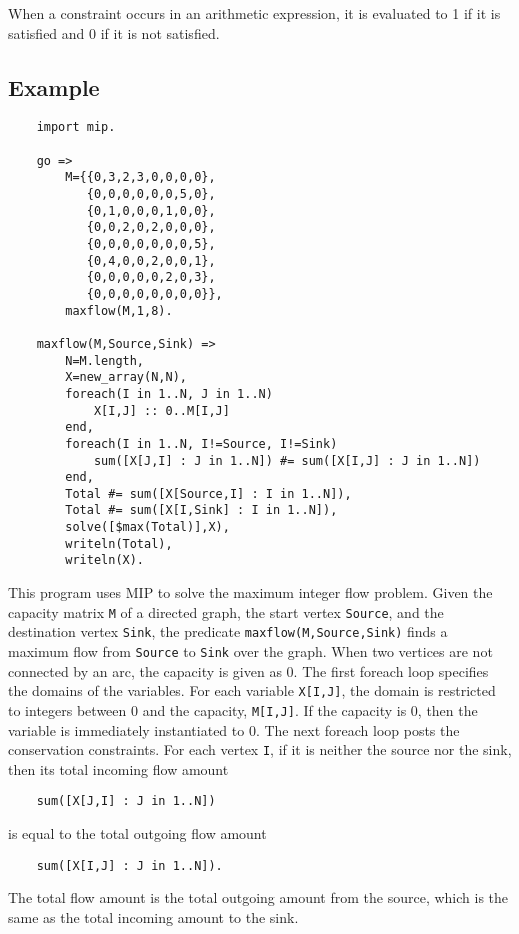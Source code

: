 When a constraint occurs in an arithmetic expression, it is evaluated to 1 if it is satisfied and 0 if it is not satisfied.

\subsection*{Example}
\begin{verbatim}
    import mip.

    go =>
        M={{0,3,2,3,0,0,0,0},
           {0,0,0,0,0,0,5,0},
           {0,1,0,0,0,1,0,0},
           {0,0,2,0,2,0,0,0},
           {0,0,0,0,0,0,0,5},
           {0,4,0,0,2,0,0,1},
           {0,0,0,0,0,2,0,3},
           {0,0,0,0,0,0,0,0}},
        maxflow(M,1,8).

    maxflow(M,Source,Sink) =>
        N=M.length,
        X=new_array(N,N),
        foreach(I in 1..N, J in 1..N)
            X[I,J] :: 0..M[I,J]
        end,
        foreach(I in 1..N, I!=Source, I!=Sink)
            sum([X[J,I] : J in 1..N]) #= sum([X[I,J] : J in 1..N]) 
        end,
        Total #= sum([X[Source,I] : I in 1..N]),
        Total #= sum([X[I,Sink] : I in 1..N]),
        solve([$max(Total)],X),
        writeln(Total),
        writeln(X).
\end{verbatim}
This program uses MIP to solve the maximum integer flow problem. Given the capacity matrix \texttt{M} of a directed graph, the start vertex \texttt{Source}, and the destination vertex \texttt{Sink}, the predicate \texttt{maxflow(M,Source,Sink)} finds a maximum flow from \texttt{Source} to \texttt{Sink} over the graph. When two vertices are not connected by an arc, the capacity is given as 0. The first foreach loop specifies the domains of the variables. For each variable \texttt{X[I,J]}, the domain is restricted to integers between 0 and the capacity, \texttt{M[I,J]}. If the capacity is 0, then the variable is immediately instantiated to 0. The next foreach loop posts the conservation constraints. For each vertex \texttt{I}, if it is neither the source nor the sink, then its total incoming flow amount 
\begin{verbatim}
    sum([X[J,I] : J in 1..N])
\end{verbatim}
is equal to the total outgoing flow amount 
\begin{verbatim}
    sum([X[I,J] : J in 1..N]).
\end{verbatim}
The total flow amount is the total outgoing amount from the source, which is the same as the total incoming amount to the sink.

